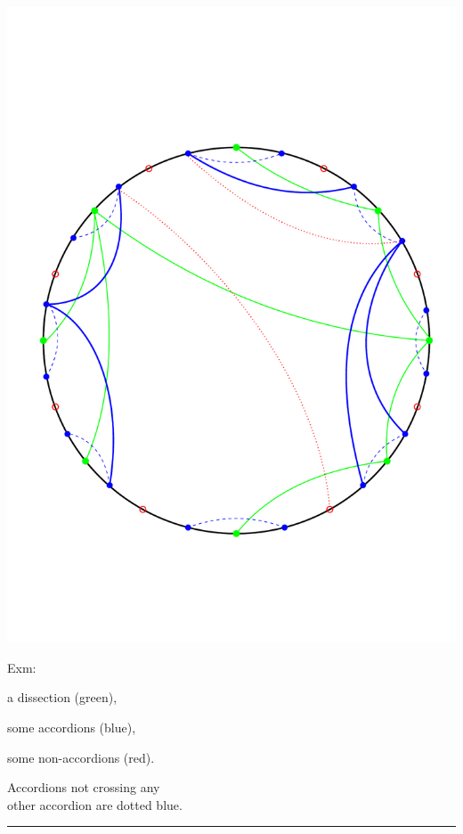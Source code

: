\documentclass[portrait,final,a0paper,fontscale=0.25]{baposter}
\theoremstyle{definition}
\begin{document}
\begin{poster}
{\hspace*{5.9cm}\includegraphics[scale=.205]{DissectionAccordions}

\vspace*{-3.3cm}
\begin{minipage}{5.7cm}
Exm:

\smallskip
\begin{compactitem}
 \item a dissection (green),
 \item some accordions (blue),
 \item some non-accordions (red).
\end{compactitem}

\medskip
Accordions not crossing any \\ other accordion are dotted blue.
\end{minipage}


\vspace{.7cm}
\hspace{-.25cm}
{\color{blue} \rule{10.02cm}{1pt}}
\vspace{-.35cm}

}
\end{poster}
\end{document}
